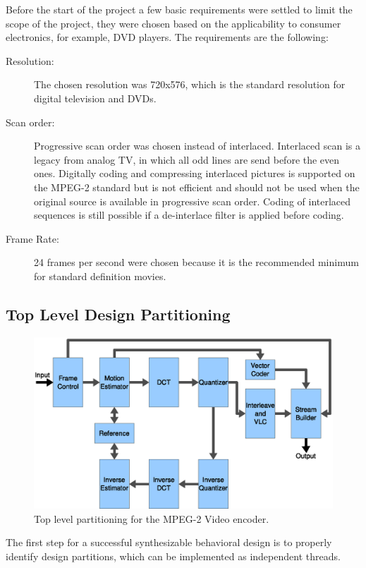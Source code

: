 \documentclass[a4paper, 12pt]{article}
\begin{document}
	Before the start of the project a few basic requirements were settled to limit the scope of the project, they were chosen based on the applicability to consumer electronics, for example, DVD players. The requirements are the following:
\begin{description}
\item[Resolution:] The chosen resolution was 720x576, which is the standard resolution for digital television and DVDs.
\item[Scan order:] Progressive scan order was chosen instead of interlaced. Interlaced scan is a legacy from analog TV, in which all odd lines are send before the even ones. Digitally coding and compressing interlaced pictures is supported on the MPEG-2 standard but is not efficient and should not be used when the original source is available in progressive scan order. Coding of interlaced sequences is still possible if a de-interlace filter is applied before coding.
\item[Frame Rate:] 24 frames per second were chosen because it is the recommended minimum for standard definition movies.
\end{description}

\subsection{Top Level Design Partitioning}
\label{partitioning}

\begin{figure}[h]
\centering
\includegraphics[width=15cm]{figs/top.eps}
\caption{Top level partitioning for the MPEG-2 Video encoder.}
\label{fig:top}
\end{figure}
	The first step for a successful synthesizable behavioral design is to properly identify design partitions, which can be implemented as independent threads.
\end{document}
